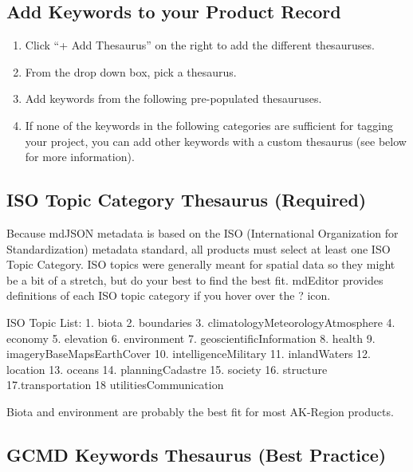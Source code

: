 \documentclass[
]{book}
\makeatletter
\providecommand{\tightlist}{%
  \setlength{\itemsep}{0pt}\setlength{\parskip}{0pt}}
\newenvironment{kframe}{%
\medskip{}
\setlength{\fboxsep}{.8em}
 \def\at@end@of@kframe{}%
 \ifinner\ifhmode%
  \def\at@end@of@kframe{\end{minipage}}%
  \begin{minipage}{\columnwidth}%
 \fi\fi%
 \def\FrameCommand##1{\hskip\@totalleftmargin \hskip-\fboxsep
 \colorbox{shadecolor}{##1}\hskip-\fboxsep
     \hskip-\linewidth \hskip-\@totalleftmargin \hskip\columnwidth}%
 \MakeFramed {\advance\hsize-\width
   \@totalleftmargin\z@ \linewidth\hsize
   \@setminipage}}%
 {\par\unskip\endMakeFramed%
 \at@end@of@kframe}
\newenvironment{rmdblock}[1]
  {
  \begin{itemize}
  \renewcommand{\labelitemi}{
    \raisebox{-.7\height}[0pt][0pt]{
      {\setkeys{Gin}{width=3em,keepaspectratio}\texttt{[image: images/\#1]}}
    }
  }
  \setlength{\fboxsep}{1em}
  \begin{kframe}
  \item
  }
  {
  \end{kframe}
  \end{itemize}
  }
\newenvironment{rmdtip}
  {\begin{rmdblock}{tip}}
  {\end{rmdblock}}
\makeatother
\begin{document}
\hypertarget{add-keywords-to-your-product-record}{%
\subsection{Add Keywords to your Product Record}\label{add-keywords-to-your-product-record}}

\begin{enumerate}
\def\labelenumi{\arabic{enumi}.}
\tightlist
\item
  Click ``+ Add Thesaurus'' on the right to add the different thesauruses.
\item
  From the drop down box, pick a thesaurus.
\item
  Add keywords from the following pre-populated thesauruses.
\item
  If none of the keywords in the following categories are sufficient for tagging your project, you can add other keywords with a custom thesaurus (see below for more information).
\end{enumerate}

\hypertarget{iso-topic-category-thesaurus-required-1}{%
\subsection{ISO Topic Category Thesaurus (Required)}\label{iso-topic-category-thesaurus-required-1}}

Because mdJSON metadata is based on the ISO (International Organization for Standardization) metadata standard, all products must select at least one ISO Topic Category. ISO topics were generally meant for spatial data so they might be a bit of a stretch, but do your best to find the best fit. mdEditor provides definitions of each ISO topic category if you hover over the ? icon.

ISO Topic List:
1. biota
2. boundaries
3. climatologyMeteorologyAtmosphere
4. economy
5. elevation
6. environment
7. geoscientificInformation
8. health
9. imageryBaseMapsEarthCover
10. intelligenceMilitary
11. inlandWaters
12. location
13. oceans
14. planningCadastre
15. society
16. structure
17.transportation
18 utilitiesCommunication

\begin{rmdtip}
Biota and environment are probably the best fit for most AK-Region
products.
\end{rmdtip}

\hypertarget{gcmd-keywords-thesaurus-best-practice-1}{%
\subsection{GCMD Keywords Thesaurus (Best Practice)}\label{gcmd-keywords-thesaurus-best-practice-1}}
\end{document}

